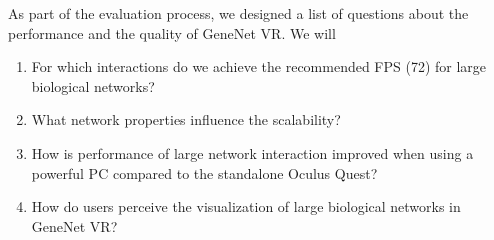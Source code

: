 


As part of the evaluation process, we designed a list of questions about the performance and the quality of GeneNet VR. We will
\begin{enumerate}
  \item For which interactions do we achieve the recommended FPS (72) for large biological networks?
  \item What network properties influence the scalability?
  \item How is performance of large network interaction improved when using a powerful PC compared to the standalone Oculus Quest?
  \item How do users perceive the visualization of large biological networks in GeneNet VR?
\end{enumerate}

